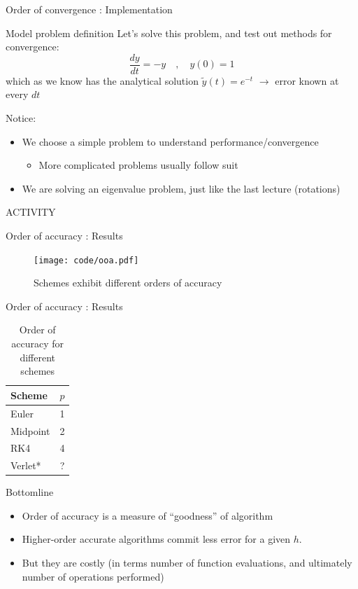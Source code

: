 \documentclass[presentation]{beamer}
\begin{document}
\begin{frame}[label={sec:org0e523d0}]{Order of convergence : Implementation}
\begin{block}{Model problem definition}
Let's solve this problem, and test out methods for convergence:
\[ \frac{dy}{dt} = -y \quad,\quad  y(0) = 1 \]
which as we know has the analytical solution \(\tilde{y}(t) = e^{-t}\) \(\rightarrow\)
error known at every \(dt\)

Notice:
\begin{itemize}
\item We choose a simple problem to understand performance/convergence
\begin{itemize}
\item More complicated problems usually follow suit
\end{itemize}
\item We are solving an eigenvalue problem, just like the last lecture (rotations)
\end{itemize}

\alert{ACTIVITY}
\end{block}
\end{frame}
\begin{frame}[label={sec:org7a74bcf}]{Order of accuracy : Results}
\begin{figure}[htbp]
\centering
\texttt{[image: code/ooa.pdf]}
\caption{Schemes exhibit different orders of accuracy}
\end{figure}
\end{frame}
\begin{frame}[label={sec:orgf7bcf07}]{Order of accuracy : Results}
\begin{table}[htbp]
\caption{\label{tab_sym_snake_params}
Order of accuracy for different schemes}
\centering
\begin{tabular}{lr}
\toprule
Scheme & \(p\)\\
\midrule
Euler & 1\\
Midpoint & 2\\
RK4 & 4\\
Verlet* & ?\\
\bottomrule
\end{tabular}
\end{table}
\end{frame}
\begin{frame}[label={sec:org083ba9e}]{Bottomline}
\begin{itemize}
\item Order of accuracy is a measure of ``goodness'' of algorithm
\item Higher-order accurate algorithms commit less error for a given \(h\).
\item But they are costly (in terms number of function evaluations, and
ultimately number of operations performed)
\end{itemize}
\end{frame}
\end{document}
